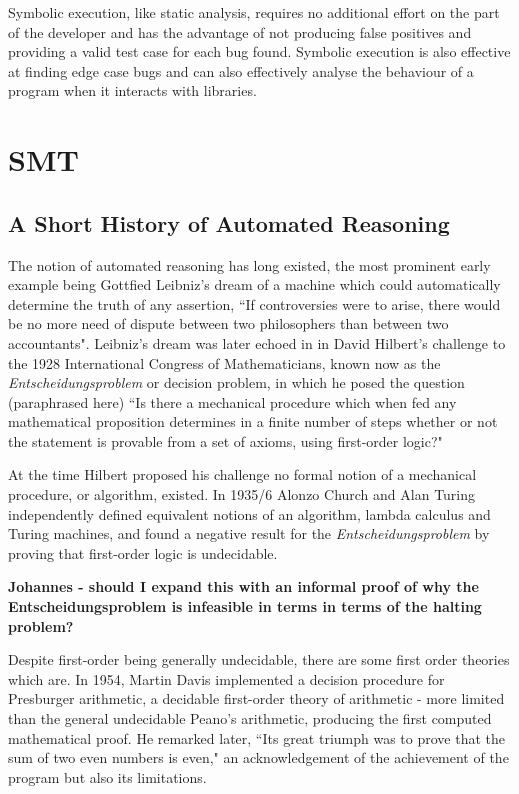 \documentclass[]{final_report}
\begin{document}
Symbolic execution, like static analysis, requires no additional effort on the part of the developer and has the advantage of not producing false positives and providing a valid test case for each bug found. Symbolic execution is also effective at finding edge case bugs and can also effectively analyse the behaviour of a program when it interacts with libraries.

\chapter{SMT}

\section{A Short History of Automated Reasoning}
The notion of automated reasoning has long existed, the most prominent early example being Gottfied Leibniz's dream of a machine which could automatically determine the truth of any assertion, ``If controversies were to arise, there would be no more need of dispute between two philosophers than between two accountants". Leibniz's dream was later echoed in in David Hilbert's challenge to the 1928 International Congress of Mathematicians, known now as the \textit{Entscheidungsproblem} or decision problem, in which he posed the question (paraphrased here) ``Is there a mechanical procedure which when fed any mathematical proposition determines in a finite number of steps whether or not the statement is provable from a set of axioms, using first-order logic?" ~\cite{smtwheredowegofromhere} ~\cite{automatedreasoningbooklet2004} 

At the time Hilbert proposed his challenge no formal notion of a mechanical procedure, or algorithm, existed. In 1935/6 Alonzo Church and Alan Turing independently defined equivalent notions of an algorithm, lambda calculus and Turing machines, and found a negative result for the \textit{Entscheidungsproblem}  by proving that first-order logic is undecidable. ~\cite{turingchurchproof}

\textbf{Johannes - should I expand this with an informal proof of why the Entscheidungsproblem is infeasible in terms in terms of the halting problem?}

Despite first-order being generally undecidable, there are some first order theories which are. In 1954, Martin Davis implemented a decision procedure for Presburger arithmetic, a decidable first-order theory of arithmetic - more limited than the general undecidable Peano's arithmetic, producing the first computed mathematical proof. He remarked later, ``Its great triumph was to prove that the sum of two even numbers is even," an acknowledgement of the achievement of the program but also its limitations. ~\cite{excapebarrettriseofsmt} ~\cite{automatedreasoningbooklet2004}
\end{document}
